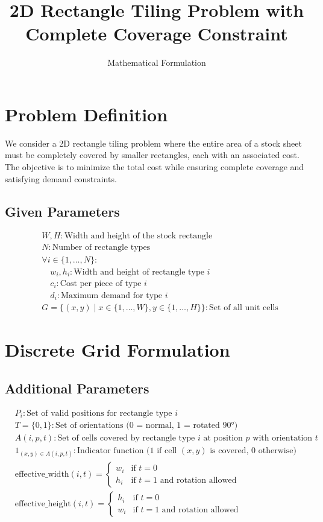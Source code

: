 \documentclass{article}
\title{2D Rectangle Tiling Problem with Complete Coverage Constraint}
\author{Mathematical Formulation}
\date{}
\begin{document}
\maketitle

\section{Problem Definition}

We consider a 2D rectangle tiling problem where the entire area of a stock sheet must be completely covered by smaller rectangles, each with an associated cost. The objective is to minimize the total cost while ensuring complete coverage and satisfying demand constraints.

\subsection{Given Parameters}
\begin{align*}
& W, H: \text{Width and height of the stock rectangle} \\
& N: \text{Number of rectangle types} \\
& \forall i \in \{1, \ldots, N\}: \\
& \quad w_i, h_i: \text{Width and height of rectangle type } i \\
& \quad c_i: \text{Cost per piece of type } i \\
& \quad d_i: \text{Maximum demand for type } i \\
& G = \{(x,y) \mid x \in \{1,\ldots,W\}, y \in \{1,\ldots,H\}\}: \text{Set of all unit cells}
\end{align*}

\section{Discrete Grid Formulation}

\subsection{Additional Parameters}
\begin{align*}
& P_i: \text{Set of valid positions for rectangle type } i \\
& T = \{0, 1\}: \text{Set of orientations (0 = normal, 1 = rotated 90°)} \\
& A(i,p,t): \text{Set of cells covered by rectangle type } i \text{ at position } p \text{ with orientation } t \\
& {1}_{(x,y) \in A(i,p,t)}: \text{Indicator function (1 if cell } (x,y) \text{ is covered, 0 otherwise)} \\
& \text{effective\_width}(i,t) = 
\begin{cases}
w_i & \text{if } t = 0 \\
h_i & \text{if } t = 1 \text{ and rotation allowed}
\end{cases} \\
& \text{effective\_height}(i,t) = 
\begin{cases}
h_i & \text{if } t = 0 \\
w_i & \text{if } t = 1 \text{ and rotation allowed}
\end{cases}
\end{align*}
\end{document}
